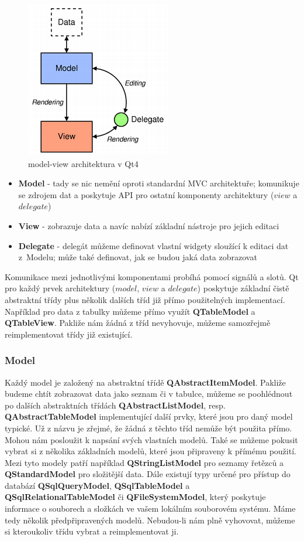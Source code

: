 \begin{figure}[h]
	\centering
	\includegraphics[scale=0.7]{pictures/qt/mv}
	\caption{model-view architektura v Qt4}
	\label{mvc}
\end{figure}

\begin{itemize}
	\item{\textbf{Model}} - tady se nic nemění oproti standardní MVC architektuře; komunikuje se zdrojem dat a poskytuje API pro ostatní komponenty architektury ($view$ a $delegate$)
	\item{\textbf{View}} - zobrazuje data a navíc nabízí základní nástroje pro jejich editaci
	\item{\textbf{Delegate}} - delegát můžeme definovat vlastní widgety sloužící k editaci dat z~Modelu; může také definovat, jak se budou jaká data zobrazovat
\end{itemize}

Komunikace mezi jednotlivými komponentami probíhá pomocí signálů a
slotů. Qt pro každý prvek architektury ($model$, $view$ a $delegate$)
poskytuje základní čistě abstraktní třídy plus několik dalších tříd
již přímo použitelných implementací. Například pro data z tabulky
můžeme přímo využít \textbf{QTableModel}
a \textbf{QTableView}. Pakliže nám žádná z tříd nevyhovuje, můžeme
samozřejmě reimplementovat třídy již existující.

\subsubsection*{Model}
Každý model je založený na abstraktní
třídě \textbf{QAbstractItemModel}. Pakliže budeme chtít zobrazovat
data jako seznam či v tabulce, můžeme se poohlédnout po dalších
abstraktních třídách \textbf{QAbstractListModel},
resp. \textbf{QAbstractTableModel} implementující další prvky, které
jsou pro daný model typické. Už z názvu je zřejmé, že žádná z těchto
tříd nemůže být použita přímo. Mohou nám posloužit k napsání svých
vlastních modelů. Také se můžeme pokusit vybrat si z několika
základních modelů, které jsou připraveny k přímému použití. Mezi tyto
modely patří například \textbf{QStringListModel} pro seznamy řetězců
a \textbf{QStandardModel} pro složitější data. Dále existují typy
určené pro přístup do
databází \textbf{QSqlQueryModel}, \textbf{QSqlTableModel}
a \textbf{QSqlRelationalTableModel} či \textbf{QFileSystemModel},
který poskytuje informace o souborech a složkách ve vašem lokálním
souborovém systému. Máme tedy několik předpřipravených
modelů. Nebudou-li nám plně vyhovovat, můžeme si kteroukoliv třídu
vybrat a reimplementovat ji.

